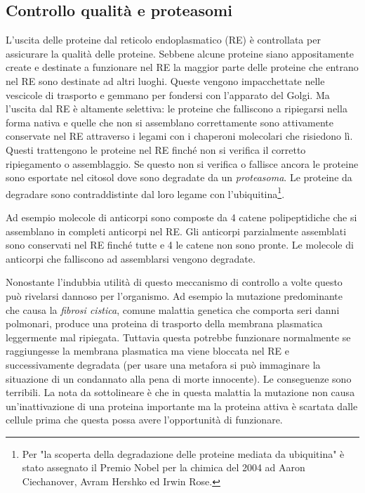\subsection{Controllo qualità e proteasomi}

L'uscita delle proteine dal reticolo endoplasmatico (RE) è controllata per assicurare la qualità delle proteine. Sebbene alcune proteine siano appositamente create e destinate a funzionare nel RE la maggior parte delle proteine che entrano nel RE sono destinate ad altri luoghi. Queste vengono impacchettate nelle vescicole di trasporto e gemmano per fondersi con l'apparato del Golgi. Ma l'uscita dal RE è altamente selettiva: le proteine che falliscono a ripiegarsi nella forma nativa e quelle che non si assemblano correttamente sono attivamente conservate nel RE attraverso i legami con i chaperoni molecolari che risiedono lì. Questi trattengono le proteine nel RE finché non si verifica il corretto ripiegamento o assemblaggio. Se questo non si verifica o fallisce ancora le proteine sono esportate nel citosol dove sono degradate da un \textit{proteasoma}. Le proteine da degradare sono contraddistinte dal loro legame con l'ubiquitina\footnote{Per "la scoperta della degradazione delle proteine mediata da ubiquitina" è stato assegnato il Premio Nobel per la chimica del 2004 ad Aaron Ciechanover, Avram Hershko ed Irwin Rose.}.

\par Ad esempio molecole di anticorpi sono composte da 4 catene polipeptidiche che si assemblano in completi anticorpi nel RE. Gli anticorpi parzialmente assemblati sono conservati nel RE finché tutte e 4 le catene non sono pronte. Le molecole di anticorpi che falliscono ad assemblarsi vengono degradate.

\par Nonostante l'indubbia utilità di questo meccanismo di controllo a volte questo può rivelarsi dannoso per l'organismo. Ad esempio la mutazione predominante che causa la \textit{fibrosi cistica}, comune malattia genetica che comporta seri danni polmonari, produce una proteina di trasporto della membrana plasmatica leggermente mal ripiegata. Tuttavia questa potrebbe funzionare normalmente se raggiungesse la membrana plasmatica ma viene bloccata nel RE e successivamente degradata\supercite{alberts2018essential} (per usare una metafora si può immaginare la situazione di un condannato alla pena di morte innocente). Le conseguenze sono terribili. La nota da sottolineare è che in questa malattia la mutazione non causa un'inattivazione di una proteina importante ma la proteina attiva è scartata dalle cellule prima che questa possa avere l'opportunità di funzionare. \\

